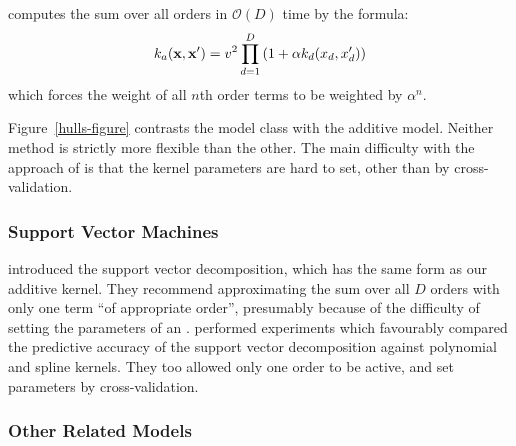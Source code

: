 \HKL{} computes the sum over all orders in $\mathcal{O}(D)$ time by the formula:
\begin{equation}
\label{eqn:uniform}
k_{a}({\bf x, x'}) = v^2 \prod_{d=1}^D \left(1 + \alpha k_{d}(x_{d}, x_{d}') \right)
\end{equation}
which forces the weight of all $n$th order terms to be weighted by $\alpha^n$.


Figure~\ref{hulls-figure} contrasts the \HKL{} model class with the additive \gp{} model.
Neither method is strictly more flexible than the other.
The main difficulty with the approach of \citet{DBLP:journals/corr/abs-0909-0844} is that the kernel parameters are hard to set, other than by cross-validation.


\subsubsection{Support Vector Machines}

\citet{vapnik1998statistical} introduced the support vector \ANOVA{} decomposition, which has the same form as our additive kernel.
They recommend approximating the sum over all $D$ orders with only one term ``of appropriate order'', presumably because of the difficulty of setting the parameters of an \SVM{}.
\citet{stitson1999support} performed experiments which favourably compared the predictive accuracy of the support vector \ANOVA{} decomposition against polynomial and spline kernels.
They too allowed only one order to be active, and set parameters by cross-validation.
%

\subsubsection{Other Related Models}

